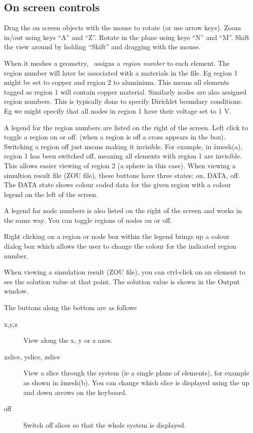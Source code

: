 \documentclass[a4paper,twoside,11pt]{book}
\begin{document}
\subsection{On screen controls}
Drag the on screen objects with the mouse to rotate (or use arrow
keys). Zoom in/out using keys ``A'' and ``Z''. Rotate in the plane
using keys ``N'' and ``M''. Shift the view around by holding ``Shift''
and dragging with the mouse.

When it meshes a geometry, \zmesh\ assigns a \emph{region number} to
each element. The region number will later be associated with a
materials in the  file. Eg region 1 might be set to copper
and region 2 to aluminium. This means all elements tagged as region 1
will contain copper material. Similarly nodes are also assigned region
numbers. This is typically done to specify Dirichlet boundary
conditions. Eg we might specify that all nodes in region 1 have their
voltage set to 1 V.

A legend for the region numbers are listed on the right of the
screen. Left click to toggle a region on or off. (when a region is off
a cross appears in the box). Switching a region off just means making
it invisible. For example, in \f{zmesh}(a), region 1 has been switched
off, meaning all elements with region 1 are invisible. This allows
easier viewing of region 2 (a sphere in this case). When viewing a
simultion result file (ZOU file), these buttons have three states: on,
DATA, off. The DATA state shows colour coded data for the given region
with a colour legend on the left of the screen.

A legend for node numbers is also listed on the right of the screen
and works in the same way. You can toggle regions of nodes on or off.

Right clicking on a region or node box within the legend brings up a
colour dialog box which allows the user to change the colour for the
indicated region number.

When viewing a simulation result (ZOU file), you can ctrl-click on an
element to see the solution value at that point. The solution value is
shown in the Output window.

The buttons along the bottom are as follows
\begin{description}
  \item[x,y,z] View along the x, y or z axes.
  \item[xslice, yslice, zslice] View a slice through the system (ie a
    single plane of elements), for example as shown in \f{zmesh}(b). You can
    change which slice is displayed using the up and down arrows on
    the keyboard.
    \item[off] Switch off slices so that the whole system is displayed.
\end{description}
\end{document}

